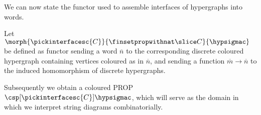 We can now state the functor used to assemble interfaces of hypergraphs into
words.

\begin{definition}
    Let \(\morph{\pickinterfacesc{C}}{\finsetpropwithnat \slice C}{\hypsigmac}\)
    be defined as functor sending a word \(\overline{n}\) to the corresponding
    discrete coloured hypergraph containing vertices coloured as in
    \(\overline{n}\), and sending a function \(\overline{m} \to \overline{n}\)
    to the induced homomorphism of discrete hypergraphs.
\end{definition}

Subsequently we obtain a coloured PROP \(
    \csp[\pickinterfacesc{C}]{\hypsigmac}
\), which will serve as the domain in which we interpret string diagrams
combinatorially.